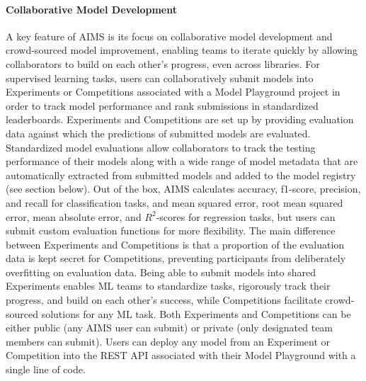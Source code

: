 \paragraph{Collaborative Model Development} A key feature of AIMS is its focus on collaborative model development and crowd-sourced model improvement, enabling teams to iterate quickly by allowing collaborators to build on each other's progress, even across libraries. For supervised learning tasks, users can collaboratively submit models into Experiments or Competitions associated with a Model Playground project in order to track model performance and rank submissions in standardized leaderboards. Experiments and Competitions are set up by providing evaluation data against which the predictions of submitted models are evaluated. Standardized model evaluations allow collaborators to track the testing performance of their models along with a wide range of model metadata that are automatically extracted from submitted models and added to the model registry (see section below). Out of the box, AIMS calculates accuracy, f1-score, precision, and recall for classification tasks, and mean squared error, root mean squared error, mean absolute error, and $R^{2}$-scores for regression tasks, but users can submit custom evaluation functions for more flexibility. The main difference between Experiments and Competitions is that a proportion of the evaluation data is kept secret for Competitions, preventing participants from deliberately overfitting on evaluation data. Being able to submit models into shared Experiments enables ML teams to standardize tasks, rigorously track their progress, and build on each other's success, while Competitions facilitate crowd-sourced solutions for any ML task. Both Experiments and Competitions can be either public (any AIMS user can submit) or private (only designated team members can submit). Users can deploy any model from an Experiment or Competition into the REST API associated with their Model Playground with a single line of code. 

